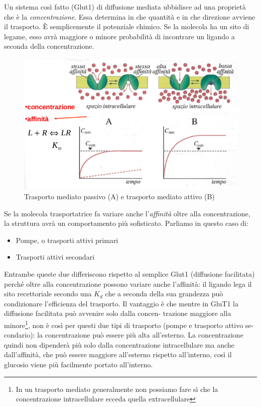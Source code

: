 \documentclass[a4paper,12pt]{article}
\begin{document}
Un sistema così fatto (Glut1) di diffusione mediata ubbidisce ad una
proprietà che è la \emph{concentrazione}.
Essa determina in che quantità e in
che direzione avviene il trasporto.
È semplicemente il potenziale chimico. Se la molecola ha un sito di
legame, esso avrà maggiore o minore probabilità di incontrare un
ligando a seconda della concentrazione.
\begin{figure}[H]
\centering
\includegraphics[scale=0.35]{immagine/mediato.jpg}
\caption{Trasporto mediato passivo (A) e trasporto mediato attivo (B)}
\end{figure}

Se la molecola trasportatrice fa variare anche l'\emph{affinità} oltre alla concentrazione, la struttura avrà un comportamento più sofisticato. Parliamo in questo caso di:
\begin{itemize}
\item{Pompe, o trasporti attivi primari}
\item{Trasporti attivi secondari}
\end{itemize}

Entrambe queste due differiscono rispetto al semplice Glut1 (diffusione facilitata) perché
oltre alla concentrazione possono variare anche l'affinità: il ligando lega il sito recettoriale secondo una $K_{d}$ che a seconda della sua grandezza può
condizionare l'efficienza del trasporto.
Il vantaggio è che mentre in GluT1 la diffusione facilitata può avvenire solo dalla concen-
trazione maggiore alla minore\footnote{In un trasporto mediato generalmente non possiamo fare sì che la concentrazione intracellulare ecceda quella extracellulare}, non è così per questi due tipi di trasporto (pompe e trasporto attivo se-
condario): la concentrazione può essere più alta all'esterno. La concentrazione quindi
non dipenderà più solo dalla concentrazione intracellulare ma anche dall’affinità, che può
essere maggiore all’esterno rispetto all’interno, così il glucosio viene più facilmente portato all’interno.
\end{document}
